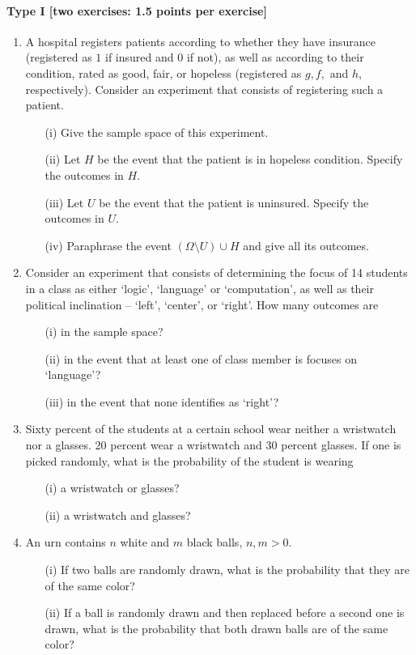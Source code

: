 \documentclass{article}
\begin{document}
\paragraph{Type I [two exercises: 1.5 points per exercise]}
\begin{enumerate}
\item A hospital registers patients according to whether they have insurance (registered as $1$ if insured and $0$ if not), as well as according to their condition, rated as good, fair, or hopeless (registered as $g, f,$ and  $h$, respectively). Consider an experiment that consists of registering such a patient. \begin{itemize}
		\item[(i)] Give the sample space of this experiment.
		\item[(ii)] Let $H$ be the event that the patient is in hopeless condition. Specify the outcomes in $H$.
		\item[(iii)] Let $U$ be the event that the patient is uninsured. Specify the outcomes in $U$.
		\item[(iv)] Paraphrase the event $(\Omega \setminus U) \cup H$ and give all its outcomes.
		\end{itemize}
	\item Consider an experiment that consists of determining the focus of 14 students in a class as either `logic', `language' or `computation', as well as their political inclination -- `left', `center', or `right'. How many outcomes are
\begin{itemize}
	\item[(i)] in the sample space?
	\item[(ii)] in the event that at least one of class member is focuses on `language'?
	\item[(iii)] in the event that none identifies as `right'?
\end{itemize}
\item Sixty percent of the students at a certain school wear neither a wristwatch nor a glasses. 20 percent wear a wristwatch and 30 percent glasses. If one is picked randomly, what is the probability of the student is wearing
	\begin{itemize}
		\item[(i)] a wristwatch or glasses?
		\item[(ii)] a wristwatch and glasses?
	\end{itemize}
\item An urn contains $n$ white and $m$ black balls, $n, m > 0$.
	\begin{itemize}
		\item[(i)] If two balls are randomly drawn, what is the probability that they are of the same color?
		\item[(ii)] If a ball is randomly drawn and then replaced before a second one is drawn, what is the probability that both drawn balls are of the same color?
	\end{itemize}
\end{enumerate}
\end{document}
